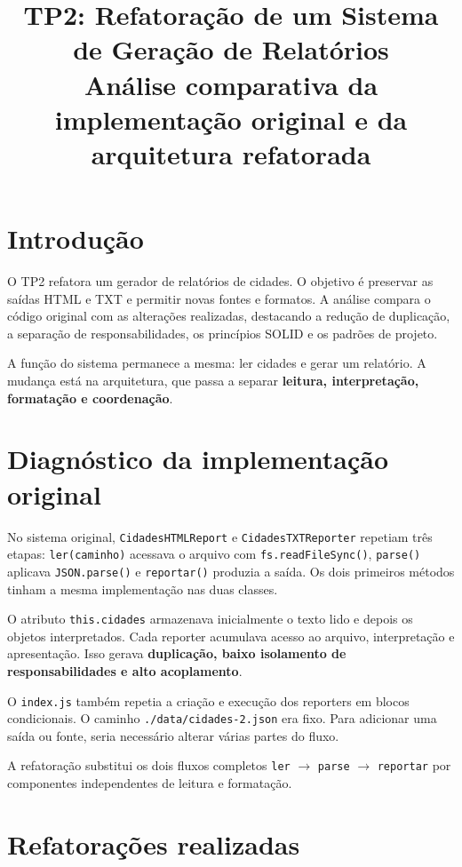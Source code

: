 \documentclass[12pt,a4paper]{article}
\title{TP2: Refatoração de um Sistema de Geração de Relatórios\\[5pt]
\large Análise comparativa da implementação original e da arquitetura refatorada}
\author{}
\date{}
\begin{document}
\maketitle
\tableofcontents
\vspace{5pt}
\small

\section{Introdução}
O TP2 refatora um gerador de relatórios de cidades. O objetivo é preservar as saídas HTML e TXT e permitir novas fontes e formatos. A análise compara o código original com as alterações realizadas, destacando a redução de duplicação, a separação de responsabilidades, os princípios SOLID e os padrões de projeto.

A função do sistema permanece a mesma: ler cidades e gerar um relatório. A mudança está na arquitetura, que passa a separar \textbf{leitura, interpretação, formatação e coordenação}.

\section{Diagnóstico da implementação original}
No sistema original, \texttt{CidadesHTMLReport} e \texttt{CidadesTXTReporter} repetiam três etapas: \texttt{ler(caminho)} acessava o arquivo com \texttt{fs.readFileSync()}, \texttt{parse()} aplicava \texttt{JSON.parse()} e \texttt{reportar()} produzia a saída. Os dois primeiros métodos tinham a mesma implementação nas duas classes.

O atributo \texttt{this.cidades} armazenava inicialmente o texto lido e depois os objetos interpretados. Cada reporter acumulava acesso ao arquivo, interpretação e apresentação. Isso gerava \textbf{duplicação, baixo isolamento de responsabilidades e alto acoplamento}.

O \texttt{index.js} também repetia a criação e execução dos reporters em blocos condicionais. O caminho \texttt{./data/cidades-2.json} era fixo. Para adicionar uma saída ou fonte, seria necessário alterar várias partes do fluxo.

A refatoração substitui os dois fluxos completos \texttt{ler} $\rightarrow$ \texttt{parse} $\rightarrow$ \texttt{reportar} por componentes independentes de leitura e formatação.

\section{Refatorações realizadas}
\end{document}
